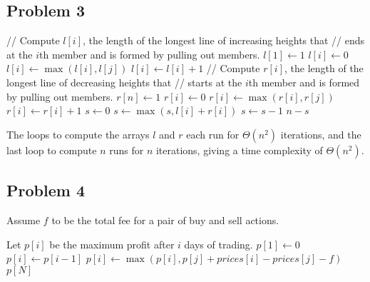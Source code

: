 \documentclass{article}
\begin{document}
\subsection*{Problem 3}

\begin{algorithmic}[1]
    \State // Compute $l[i]$, the length of the longest line of increasing heights that
    \State // ends at the $i$th member and is formed by pulling out members.
    \State $l[1] \gets 1$
        \State $l[i] \gets 0$
                \State $l[i] \gets \max(l[i], l[j])$
            \EndIf
        \EndFor
        \State $l[i] \gets l[i] + 1$
    \EndFor
    \State // Compute $r[i]$, the length of the longest line of decreasing heights that
    \State // starts at the $i$th member and is formed by pulling out members.
    \State $r[n] \gets 1$
        \State $r[i] \gets 0$
                \State $r[i] \gets \max(r[i], r[j])$
            \EndIf
        \EndFor
        \State $r[i] \gets r[i] + 1$
    \EndFor
    \State $s \gets 0$ 
        \State $s \gets \max(s, l[i] + r[i])$
    \EndFor
    \State $s \gets s - 1$
    \State \Return $n - s$
\end{algorithmic}

The loops to compute the arrays $l$ and $r$ each run for $\Theta(n^2)$ iterations, and the last loop to compute $n$ runs for $n$ iterations, giving a time complexity of $\Theta(n^2)$.

\subsection*{Problem 4}

Assume $f$ to be the total fee for a pair of buy and sell actions.

\begin{algorithmic}[1]
    \State Let $p[i]$ be the maximum profit after $i$ days of trading.
    \State $p[1] \gets 0$
        \State $p[i] \gets p[i - 1]$
            \State $p[i] \gets \max(p[i], p[j] + prices[i] - prices[j] - f)$
        \EndFor
    \EndFor
    \State \Return $p[N]$
\end{algorithmic}
\end{document}
